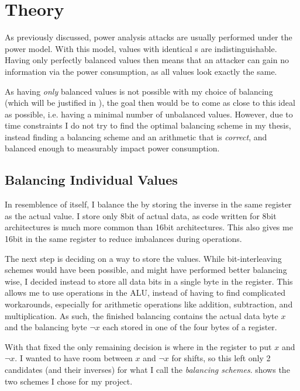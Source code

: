 \section{Theory}
\label{theory}
As previously discussed, power analysis attacks are usually performed under the \hammingw{} power model.
With this model, values with identical \hammingw{}s are indistinguishable.
Having only perfectly balanced values then means that an attacker can gain no information via the power consumption, as all values look exactly the same.

As having \emph{only} balanced values is not possible with my choice of balancing (which will be justified in ), the goal then would be to come as close to this ideal as possible, i.e. having a minimal number of unbalanced values.
However, due to time constraints I do not try to find the optimal balancing scheme in my thesis, instead finding a balancing scheme and an arithmetic that is \emph{correct}, and balanced enough to measurably impact power consumption.

\subsection{Balancing Individual Values}
\label{values}
In resemblence of \dual{} itself, I balance the \hammingw{} by storing the inverse in the same register as the actual value.
I store only 8bit of actual data, as code written for 8bit architectures is much more common than 16bit architectures.
This also gives me 16bit in the same register to reduce imbalances during operations.

The next step is deciding on a way to store the values.
While bit-interleaving schemes would have been possible, and might have performed better balancing wise, I decided instead to store all data bits in a single byte in the register.
This allows me to use operations in the ALU, instead of having to find complicated workarounds, especially for arithmetic operations like addition, subtraction, and multiplication.
As such, the finished balancing contains the actual data byte $x$ and the balancing byte $\neg{x}$ each stored in one of the four bytes of a register.

With that fixed the only remaining decision is where in the register to put $x$ and $\neg{x}$.
I wanted to have room between $x$ and $\neg{x}$ for shifts, so this left only 2 candidates (and their inverses) for what I call the \emph{balancing schemes}.
 shows the two schemes I chose for my project.

